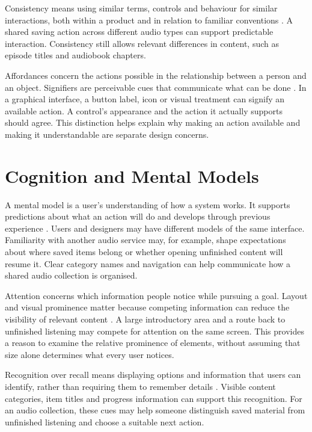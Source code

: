 Consistency means using similar terms, controls and behaviour for similar
interactions, both within a product and in relation to familiar conventions
\cite[Sec.~4]{nielsenheuristics}. A shared saving action across different audio
types can support predictable interaction. Consistency still allows relevant
differences in content, such as episode titles and audiobook chapters.

Affordances concern the actions possible in the relationship between a
person and an object. Signifiers are perceivable cues that communicate what
can be done \cite{normansignifiers}. In a graphical interface, a button label,
icon or visual treatment can signify an available action. A control's
appearance and the action it actually supports should agree. This distinction
helps explain why making an action available and making it understandable
are separate design concerns.

\section{Cognition and Mental Models}
\label{sec:cognition-mental-models}

A mental model is a user's understanding of how a system works. It supports
predictions about what an action will do and develops through previous
experience \cite[Sec.~``What Are Mental Models?'']{chanmentalmodels}. Users
and designers may have different models of the same interface. Familiarity
with another audio service may, for example, shape expectations about where
saved items belong or whether opening unfinished content will resume it.
Clear category names and navigation can help communicate how a shared audio
collection is organised.

Attention concerns which information people notice while pursuing a goal.
Layout and visual prominence matter because competing information can reduce
the visibility of relevant content \cite[Sec.~8]{nielsenheuristics}. A large
introductory area and a route back to unfinished listening may compete for
attention on the same screen. This provides a reason to examine the relative
prominence of elements, without assuming that size alone determines what
every user notices.

Recognition over recall means displaying options and information that users
can identify, rather than requiring them to remember details
\cite[Sec.~6]{nielsenheuristics}. Visible content categories, item titles and
progress information can support this recognition. For an audio collection,
these cues may help someone distinguish saved material from unfinished
listening and choose a suitable next action.

